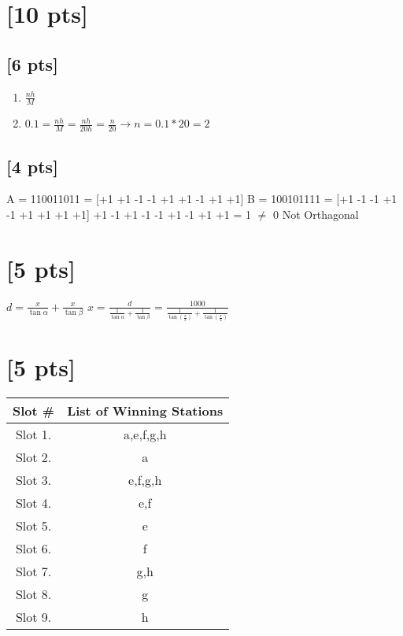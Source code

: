 \documentclass{article}
\begin{document}
    \section{[10 pts]} %
        \subsection{[6 pts]} %
            \begin{enumerate}
                \item $\frac{nh}{M}$
                \item $0.1 = \frac{nh}{M}=\frac{nh}{20h}=\frac{n}{20} \rightarrow
                n = 0.1 * 20 = 2$
            \end{enumerate}
        \subsection{[4 pts]} %
            A = 110011011 = [+1 +1 -1 -1 +1 +1 -1 +1 +1]
            \newline
            B = 100101111 = [+1 -1 -1 +1 -1 +1 +1 +1 +1]
            \newline
            \makebox[2.8cm]{} +1 -1 +1 -1 -1 +1 -1 +1 +1 = 1 $\neq$ 0
            \newline
            Not Orthagonal
            
    \section{[5 pts]}  %
        $d = \frac{x}{\tan \alpha} + \frac{x}{\tan \beta}$
        \newline
        $x = \frac{d}{\frac{1}{\tan \alpha} + \frac{1}{\tan \beta}} = \frac{1000}{\frac{1}{\tan (\frac{\pi}{3})} + \frac{1}{\tan (\frac{\pi}{4})}}$
    \section{[5 pts]}  %
        \begin{tabular}{|c||c|}
            \hline
            Slot \# & List of Winning Stations \\
            \hline
            Slot 1. & a,e,f,g,h \\
            \hline
            Slot 2. & a \\
            \hline
            Slot 3. & e,f,g,h \\
            \hline
            Slot 4. & e,f \\
            \hline
            Slot 5. & e \\
            \hline
            Slot 6. & f \\
            \hline
            Slot 7. & g,h \\
            \hline
            Slot 8. & g \\
            \hline
            Slot 9. & h \\
            \hline
        \end{tabular}
\end{document}
